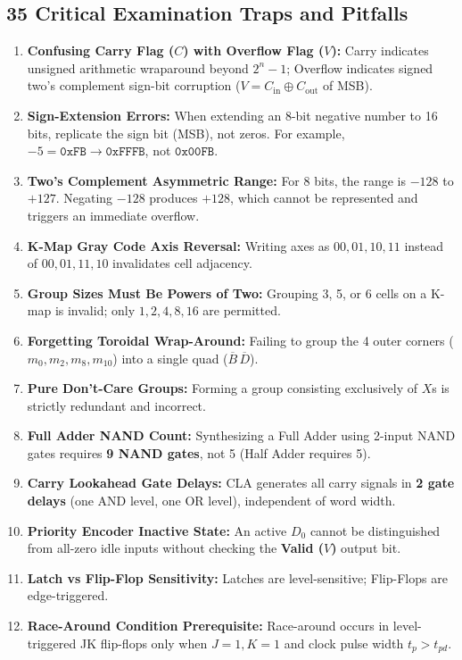 \subsection{35 Critical Examination Traps and Pitfalls}
\begin{enumerate}[label=\bfseries\arabic*.]
    \item \textbf{Confusing Carry Flag ($C$) with Overflow Flag ($V$):} Carry indicates unsigned arithmetic wraparound beyond $2^n - 1$; Overflow indicates signed two's complement sign-bit corruption ($V = C_{\text{in}} \oplus C_{\text{out}}$ of MSB).
    \item \textbf{Sign-Extension Errors:} When extending an 8-bit negative number to 16 bits, replicate the sign bit (MSB), not zeros. For example, $-5 = \texttt{0xFB} \to \texttt{0xFFFB}$, not $\texttt{0x00FB}$.
    \item \textbf{Two's Complement Asymmetric Range:} For 8 bits, the range is $-128$ to $+127$. Negating $-128$ produces $+128$, which cannot be represented and triggers an immediate overflow.
    \item \textbf{K-Map Gray Code Axis Reversal:} Writing axes as $00, 01, 10, 11$ instead of $00, 01, 11, 10$ invalidates cell adjacency.
    \item \textbf{Group Sizes Must Be Powers of Two:} Grouping 3, 5, or 6 cells on a K-map is invalid; only $1, 2, 4, 8, 16$ are permitted.
    \item \textbf{Forgetting Toroidal Wrap-Around:} Failing to group the 4 outer corners ($m_0, m_2, m_8, m_{10}$) into a single quad ($\overline{B}\,\overline{D}$).
    \item \textbf{Pure Don't-Care Groups:} Forming a group consisting exclusively of $X$s is strictly redundant and incorrect.
    \item \textbf{Full Adder NAND Count:} Synthesizing a Full Adder using 2-input NAND gates requires \textbf{9 NAND gates}, not 5 (Half Adder requires 5).
    \item \textbf{Carry Lookahead Gate Delays:} CLA generates all carry signals in \textbf{2 gate delays} (one AND level, one OR level), independent of word width.
    \item \textbf{Priority Encoder Inactive State:} An active $D_0$ cannot be distinguished from all-zero idle inputs without checking the \textbf{Valid ($V$)} output bit.
    \item \textbf{Latch vs Flip-Flop Sensitivity:} Latches are level-sensitive; Flip-Flops are edge-triggered.
    \item \textbf{Race-Around Condition Prerequisite:} Race-around occurs in level-triggered JK flip-flops only when $J=1, K=1$ and clock pulse width $t_p > t_{pd}$.

\end{enumerate}
